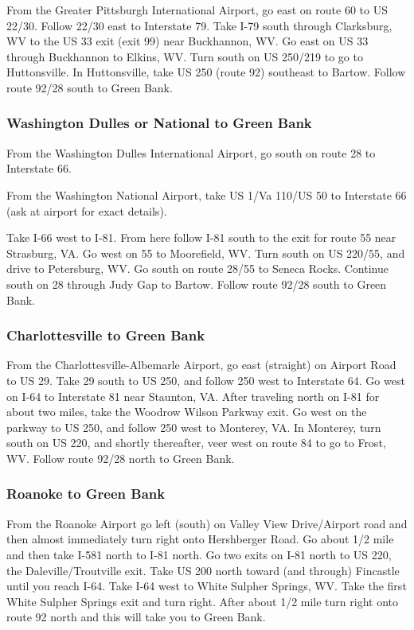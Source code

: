 From the Greater Pittsburgh International Airport, go east
   on route 60 to US 22/30. Follow 22/30 east to Interstate 79. 
   Take I-79 south through Clarksburg, WV to the US 33 exit (exit 99) near 
   Buckhannon, WV. Go east on US 33 through Buckhannon to Elkins, 
   WV. Turn south on US 250/219 to go to Huttonsville. In 
   Huttonsville, take US 250 (route 92) southeast to Bartow. 
   Follow route 92/28 south to Green Bank.

\subsubsection{Washington Dulles or National to Green Bank}

From the Washington Dulles International Airport, go south
   on route 28 to Interstate 66. 

From the Washington National Airport, take US 1/Va 110/US 50 to Interstate
66 (ask at airport for exact details).

Take I-66 west to I-81. From 
   here follow I-81 south to the exit for route 55 near 
   Strasburg, VA. Go west on 55 to Moorefield, WV. Turn 
   south on US 220/55, and drive to Petersburg, WV. Go 
   south on route 28/55 to Seneca Rocks. Continue south 
   on 28 through Judy Gap to Bartow. Follow route 92/28 
   south to Green Bank.

\subsubsection{Charlottesville to Green Bank}

From the Charlottesville-Albemarle Airport, go east (straight) 
   on Airport Road to US 29. Take 29 south to US 250, and follow 
   250 west to Interstate 64. Go west on I-64 to Interstate 81 
   near Staunton, VA. After traveling north on I-81 for about
   two miles, take the Woodrow Wilson Parkway exit. Go west on 
   the parkway to US 250, and follow 250 west to Monterey, VA. 
   In Monterey, turn south on US 220, and shortly thereafter,
   veer west on route 84 to go to Frost, WV. Follow route 
   92/28 north to Green Bank.

\subsubsection{Roanoke to Green Bank}

From the Roanoke Airport go left (south) on Valley View Drive/Airport
road and then almost immediately turn right onto Hershberger
Road.  Go about 1/2 mile and then take I-581 north to I-81
north.  Go two exits on I-81 north to US 220, the Daleville/Troutville
exit.  Take US 200 north toward (and through) Fincastle until
you reach I-64.  Take I-64 west to White Sulpher Springs, WV.
Take the first White Sulpher Springs exit and turn right.  After
about 1/2 mile turn right onto route 92 north and this will take
you to Green Bank.

